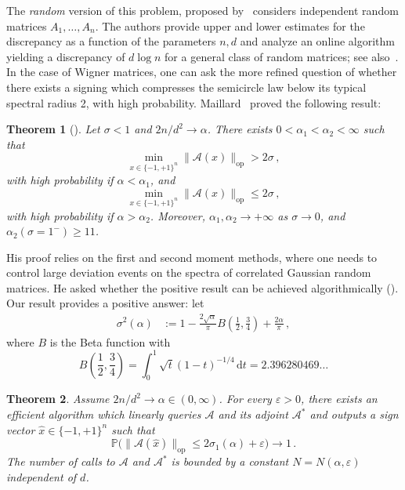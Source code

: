 \documentclass[11pt]{article}
\newtheorem{theorem}{Theorem}[section]
\theoremstyle{definition}
\theoremstyle{remark}
\numberwithin{equation}{section}
\numberwithin{theorem}{section}
\newcommand{\Prob}{\mathbb P}
\newcommand{\op}{\mathrm{op}}
\newcommand{\cA}{\mathcal A}
\newcommand{\rmd}{\mathrm{d}}
\begin{document}
The \emph{random} version of this problem, proposed by~\cite{kunisky2023average} considers independent random matrices $A_1,\ldots,A_n$. The authors provide upper and lower estimates for the discrepancy as a function of the parameters $n,d$ and analyze an online algorithm yielding a discrepancy of $d 
\log n$ for a general class of random matrices; see also~\cite{kunisky2024asymptotic}. In the case of Wigner matrices, one can ask the more refined question of whether there exists a signing which compresses the semicircle law below its typical spectral radius 2, with high probability. Maillard~\cite{maillard2025average} proved the following result:
\begin{theorem}[\cite{maillard2025average}]\label{thm:maillard}
    Let $\sigma<1$ and $2n/d^2 \to \alpha$. There exists $0 < \alpha_1< \alpha_2 <\infty$ such that
    \[\min_{x \in \{-1,+1\}^n} \big\|\cA(x)\big\|_{\op} > 2\sigma \,,  \]
    with high probability if $\alpha<\alpha_1$, and  
    \[\min_{x \in \{-1,+1\}^n} \big\|\cA(x)\big\|_{\op} \le 2\sigma \,,  \]
    with high probability if $\alpha>\alpha_2$. 
    Moreover, $\alpha_1, \alpha_2 \to +\infty$ as $\sigma \to 0$, and $\alpha_2(\sigma = 1^-) \ge 11$.
\end{theorem}
His proof relies on the first and second moment methods, where one needs to control large deviation events on the spectra of correlated Gaussian random matrices. He asked whether the positive result can be achieved algorithmically (\cite[Open Question 1.4]{maillard2025average}). Our result provides a positive answer:         
let 
\begin{align}
 \sigma^2(\alpha)
 &:=
 1-\frac{2\sqrt\alpha}{\pi}
 B\left(\frac12,\frac34\right)
 +\frac{2\alpha}{\pi}\,,
 \label{eq:sigma-one-endpoint}
\end{align}
where $B$ is the Beta function with
\[
B\left(\frac12,\frac34\right) =  \int_0^1\sqrt{t}(1-t)^{-1/4}\,\rmd t = 2.396280469\ldots
\]

\begin{theorem}
\label{thm:random_matrix_discrepancy}
Assume $2n/d^2\to\alpha\in(0,\infty)$.  For every
$\varepsilon>0$, there exists an efficient algorithm which linearly queries $\cA$ and its adjoint $\cA^*$ and outputs a sign vector $\widehat x\in\{-1,+1\}^n$ such that
\begin{equation}\label{eq:binary-final-bound}
 \Prob\big(
 \|\cA(\widehat x)\|_{\op}
 \le 2\sigma_1(\alpha)+\varepsilon
 \big)\longrightarrow 1\,.
\end{equation}
The number of calls to $\cA$ and $\cA^*$ is bounded by a constant
$N=N(\alpha,\varepsilon)$ independent of $d$.
\end{theorem}
\end{document}
